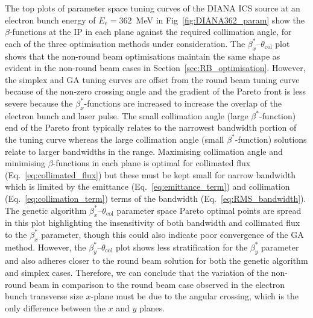 \documentclass[../main.tex]{subfiles}
\begin{document}
The top plots of parameter space tuning curves of the DIANA ICS source at an electron bunch energy of $E_{e}=362$~\si{\mega\electronvolt} in Fig~\ref{fig:DIANA362_param} show the $\beta$-functions at the IP in each plane against the required collimation angle, for each of the three optimisation methods under consideration. The $\beta_{x}^{*}$--$\theta_{\mathrm{col}}$ plot shows that the non-round beam optimisations maintain the same shape as evident in the non-round beam cases in Section~\ref{sec:RB_optimisation}. However, the simplex and GA tuning curves are offset from the round beam tuning curve because of the non-zero crossing angle and the gradient of the Pareto front is less severe because the $\beta_{x}^{*}$-functions are increased to increase the overlap of the electron bunch and laser pulse. The small collimation angle (large $\beta^{*}$-function) end of the Pareto front typically relates to the narrowest bandwidth portion of the tuning curve whereas the large collimation angle (small $\beta^{*}$-function) solutions relate to larger bandwidths in the range. Maximising collimation angle and minimising $\beta$-functions in each plane is optimal for collimated flux (Eq.~\ref{eq:collimated_flux}) but these must be kept small for narrow bandwidth which is limited by the emittance (Eq.~\ref{eq:emittance_term}) and collimation (Eq.~\ref{eq:collimation_term}) terms of the bandwidth (Eq.~\ref{eq:RMS_bandwidth}). The genetic algorithm $\beta_{x}^{*}$--$\theta_{\mathrm{col}}$ parameter space Pareto optimal points are spread in this plot highlighting the insensitivity of both bandwidth and collimated flux to the $\beta_{x}^{*}$ parameter, though this could also indicate poor convergence of the GA method. However, the $\beta_{y}^{*}$--$\theta_{\mathrm{col}}$ plot shows less stratification for the $\beta_{y}^{*}$ parameter and also adheres closer to the round beam solution for both the genetic algorithm and simplex cases. Therefore, we can conclude that the variation of the non-round beam in comparison to the round beam case observed in the electron bunch transverse size $x$-plane must be due to the angular crossing, which is the only difference between the $x$ and $y$ planes.
\end{document}
